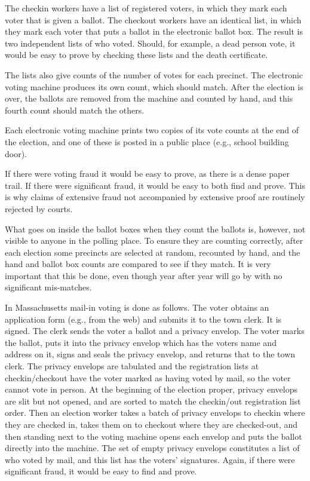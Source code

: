 \documentclass[12pt]{article}
\begin{document}
The checkin workers have a list of registered voters, in which
they mark each voter that is given a ballot.  The checkout workers
have an identical list, in which they mark each voter that puts
a ballot in the electronic ballot box.  The result is two independent
lists of who voted.  Should, for example, a dead person vote, it
would be easy to prove by checking these lists and the death certificate.

The lists also give counts of the number of votes for each precinct.
The electronic voting machine produces its own count, which should match.
After the election is over, the ballots are removed from the machine
and counted by hand, and this fourth count should match the others.

Each electronic voting machine prints two copies of its vote counts
at the end of
the election, and one of these is posted in a public place (e.g., school
building door).

If there were voting fraud it would be easy to prove, as there is
a dense paper trail.  If there were significant fraud, it would be
easy to both find and prove.  This is why claims of extensive
fraud not accompanied by extensive proof are routinely rejected by courts.

What goes on inside the ballot boxes when they count the ballots
is, however, not visible to anyone in the polling place.  To ensure
they are counting correctly, after each election some precincts
are selected at random, recounted by hand, and the hand and ballot
box counts are compared to see if they match.  It is very
important that this be done, even though year after year will go
by with no significant mis-matches.

In Massachusetts mail-in voting is done as follows.  The voter
obtains an application form (e.g., from the web) and submits it to the
town clerk.  It is signed.  The clerk sends the voter a ballot
and a privacy envelop.  The voter marks the ballot, puts it
into the privacy envelop which has the voters name and address
on it, signs and seals the privacy envelop, and returns that to the town
clerk.  The privacy envelops are tabulated and the registration
lists at checkin/checkout have the voter marked as having
voted by mail, so the voter cannot vote in person.  At the
beginning of the election proper, privacy envelops are slit
but not opened, and are sorted to match the checkin/out registration
list order.  Then an election worker takes a batch of privacy envelops
to checkin where they are checked in, takes them on to checkout
where they are checked-out, and then standing next to the voting
machine opens each envelop and puts the ballot directly into the machine.
The set of empty privacy envelops constitutes a list of who voted
by mail, and this list has the voters' signatures.
Again, if there were significant fraud, it would be
easy to find and prove.
\end{document}
